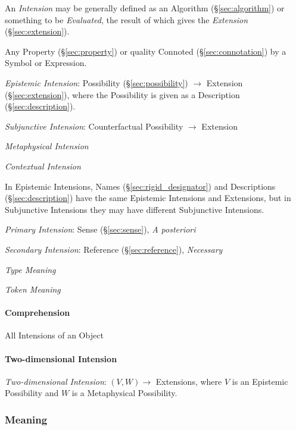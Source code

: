 An \emph{Intension} may be generally defined as an Algorithm
(\S\ref{sec:algorithm}) or something to be \emph{Evaluated}, the
result of which gives the \emph{Extension} (\S\ref{sec:extension}).

Any Property (\S\ref{sec:property}) or quality Connoted
(\S\ref{sec:connotation}) by a Symbol or Expression.

\emph{Epistemic Intension}: Possibility (\S\ref{sec:possibility})
$\rightarrow$ Extension (\S\ref{sec:extension}), where the Possibility
is given as a Description (\S\ref{sec:description}).

\emph{Subjunctive Intension}: Counterfactual Possibility $\rightarrow$
Extension

\emph{Metaphysical Intension} %

\emph{Contextual Intension}

In Epistemic Intensions, Names (\S\ref{sec:rigid_designator}) and
Descriptions (\S\ref{sec:description}) have the same Epistemic
Intensions and Extensions, but in Subjunctive Intensions they may have
different Subjunctive Intensions.

\emph{Primary Intension}: Sense (\S\ref{sec:sense}), \emph{A
  posteriori}

\emph{Secondary Intension}: Reference (\S\ref{sec:reference}),
\emph{Necessary}

\emph{Type Meaning}

\emph{Token Meaning}



\paragraph{Comprehension}\label{sec:comprehension}\hfill

All Intensions of an Object



\paragraph{Two-dimensional Intension}\label{sec:twodimensional_intension}\hfill

\emph{Two-dimensional Intension}: $(V,W) \rightarrow$ Extensions,
where $V$ is an Epistemic Possibility and $W$ is a Metaphysical
Possibility.



\subsubsection{Meaning}\label{sec:meaning}

